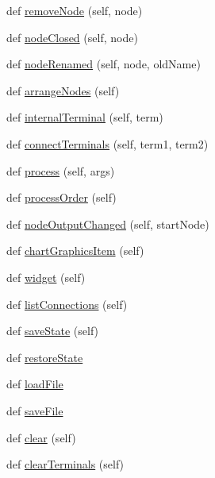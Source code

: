 \begin{DoxyCompactItemize}
\item 
def \hyperlink{classFlowchart_1_1Flowchart_a22f1160b3d3d1e3c5f057e7892d39cec}{remove\+Node} (self, node)
\item 
def \hyperlink{classFlowchart_1_1Flowchart_aa83a10395120a432ccd3652490492bad}{node\+Closed} (self, node)
\item 
def \hyperlink{classFlowchart_1_1Flowchart_a7b1c9ebb36cf249033c9c83dbc3a6270}{node\+Renamed} (self, node, old\+Name)
\item 
def \hyperlink{classFlowchart_1_1Flowchart_a537cee7791c6a5e4967abaa95dc9f5a1}{arrange\+Nodes} (self)
\item 
def \hyperlink{classFlowchart_1_1Flowchart_aee57c9d9e6b1ad11674a76ffb39af25c}{internal\+Terminal} (self, term)
\item 
def \hyperlink{classFlowchart_1_1Flowchart_adfcf35da3671fb358ff0269f523779cd}{connect\+Terminals} (self, term1, term2)
\item 
def \hyperlink{classFlowchart_1_1Flowchart_a500d5ffa2b35e2dc7957a1f6fc8b0f03}{process} (self, args)
\item 
def \hyperlink{classFlowchart_1_1Flowchart_a93e115629a83742fb6e56a097b9933aa}{process\+Order} (self)
\item 
def \hyperlink{classFlowchart_1_1Flowchart_a597ecc78975eb0282a7fb27a18607f04}{node\+Output\+Changed} (self, start\+Node)
\item 
def \hyperlink{classFlowchart_1_1Flowchart_ad333158ef19a03900a04385040f34619}{chart\+Graphics\+Item} (self)
\item 
def \hyperlink{classFlowchart_1_1Flowchart_aedc60bdaa12f0f770f374c092627152f}{widget} (self)
\item 
def \hyperlink{classFlowchart_1_1Flowchart_aafaca14aa2ae86e47c5e612b295f4223}{list\+Connections} (self)
\item 
def \hyperlink{classFlowchart_1_1Flowchart_a08642baf6464e8204e22adba5ada10dd}{save\+State} (self)
\item 
def \hyperlink{classFlowchart_1_1Flowchart_a78ab4d9dd038474d60fea7022f1314c9}{restore\+State}
\item 
def \hyperlink{classFlowchart_1_1Flowchart_a4d3185eecefc706d494ff9f8c1745d20}{load\+File}
\item 
def \hyperlink{classFlowchart_1_1Flowchart_a4024020c43a79d8302f5d1092b268922}{save\+File}
\item 
def \hyperlink{classFlowchart_1_1Flowchart_a936033a79a4c84dd73a10a52d30403d4}{clear} (self)
\item 
def \hyperlink{classFlowchart_1_1Flowchart_a0b248ff0a286a39a2ff70a8ffd8cdb1d}{clear\+Terminals} (self)
\end{DoxyCompactItemize}
